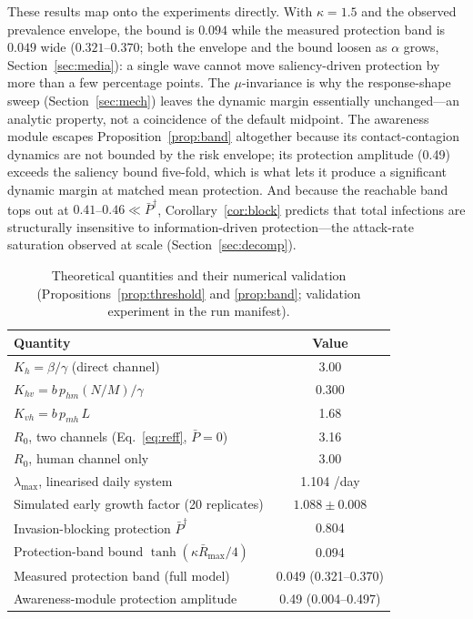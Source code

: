 \documentclass[]{interact}
\begin{document}
These results map onto the experiments directly. With $\kappa{=}1.5$ and the observed prevalence envelope, the bound is $0.094$ while the measured protection band is $0.049$ wide ($0.321$--$0.370$; both the envelope and the bound loosen as $\alpha$ grows, Section~\ref{sec:media}): a single wave cannot move saliency-driven protection by more than a few percentage points. The $\mu$-invariance is why the response-shape sweep (Section~\ref{sec:mech}) leaves the dynamic margin essentially unchanged---an analytic property, not a coincidence of the default midpoint. The awareness module escapes Proposition~\ref{prop:band} altogether because its contact-contagion dynamics are not bounded by the risk envelope; its protection amplitude (0.49) exceeds the saliency bound five-fold, which is what lets it produce a significant dynamic margin at matched mean protection. And because the reachable band tops out at $0.41$--$0.46 \ll \bar{P}^{\dagger}$, Corollary~\ref{cor:block} predicts that total infections are structurally insensitive to information-driven protection---the attack-rate saturation observed at scale (Section~\ref{sec:decomp}).

\begin{table}[htb]
\centering
\small
\begin{tabular}{lc}
\hline
\textbf{Quantity} & \textbf{Value} \\
\hline
$K_h = \beta/\gamma$ (direct channel) & 3.00 \\
$K_{hv} = b\,p_{hm}(N/M)/\gamma$ & 0.300 \\
$K_{vh} = b\,p_{mh}\,L$ & 1.68 \\
$R_0$, two channels (Eq.~\ref{eq:reff}, $\bar{P}{=}0$) & 3.16 \\
$R_0$, human channel only & 3.00 \\
$\lambda_{\max}$, linearised daily system & 1.104 /day \\
Simulated early growth factor (20 replicates) & $1.088 \pm 0.008$ \\
Invasion-blocking protection $\bar{P}^{\dagger}$ & 0.804 \\
Protection-band bound $\tanh(\kappa \bar{R}_{\max}/4)$ & 0.094 \\
Measured protection band (full model) & 0.049 (0.321--0.370) \\
Awareness-module protection amplitude & 0.49 (0.004--0.497) \\
\hline
\end{tabular}
\caption{Theoretical quantities and their numerical validation (Propositions~\ref{prop:threshold} and \ref{prop:band}; validation experiment in the run manifest).}
\label{tab:theory}
\end{table}
\end{document}
